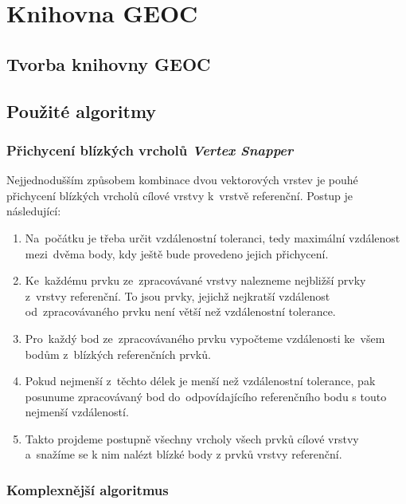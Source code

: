 \chapter{Knihovna GEOC}
\label{5-geoc}

\section{Tvorba knihovny GEOC}
\label{knihovna}


\section{Použité algoritmy}
\label{algoritmy}

\subsection{ Přichycení blízkých vrcholů \textit{Vertex Snapper} }
\label{vertexsnapper}

Nejjednodušším způsobem kombinace dvou vektorových vrstev je pouhé přichycení blízkých vrcholů cílové vrstvy k~vrstvě referenční. Postup je následující:

\begin{enumerate}[leftmargin=*]
 \item Na~počátku je třeba určit vzdálenostní toleranci, tedy maximální vzdálenost mezi~dvěma body, kdy ještě bude provedeno jejich přichycení.
 \item Ke~každému prvku ze~zpracovávané vrstvy nalezneme nejbližší prvky z~vrstvy referenční. To jsou prvky, jejichž nejkratší vzdálenost od~zpracovávaného prvku není větší
	než vzdálenostní tolerance.
 \item Pro~každý bod ze~zpracovávaného prvku vypočteme vzdálenosti ke~všem bodům z~blízkých referenčních prvků.
 \item Pokud nejmenší z~těchto délek je menší než vzdálenostní tolerance, pak posunume zpracovávaný bod do~odpovídajícího referenčního bodu s touto nejmenší vzdáleností.
 \item Takto projdeme postupně všechny vrcholy všech prvků cílové vrstvy a~snažíme se k nim nalézt blízké body z prvků vrstvy referenční. 
\end{enumerate}

 


\subsection{ Komplexnější algoritmus }
\label{conflation algorithm}

